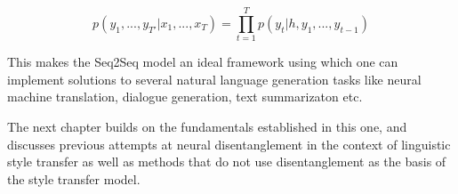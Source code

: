 \begin{equation}
	p(y_1, ... , y_{T′} | x_1, ... , x_T) =	\prod_{t=1}^T p(y_t | h, y_1, ... , y_{t−1})
\end{equation}

This makes the Seq2Seq model an ideal framework using which one can implement solutions to several natural language generation tasks like neural machine translation, dialogue generation, text summarizaton etc.




The next chapter builds on the fundamentals established in this one, and discusses previous attempts at neural disentanglement in the context of linguistic style transfer as well as methods that do not use disentanglement as the basis of the style transfer model.
